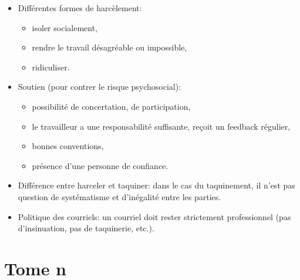 \documentclass[a4paper]{article}
\begin{document}
\begin{itemize}
\item Différentes formes de harcèlement:
\begin{itemize}
    \item isoler socialement,
    \item rendre le travail désagréable ou impossible,
    \item ridiculiser.
\end{itemize}





\item Soutien (pour contrer le risque psychosocial):
\begin{itemize}
    \item possibilité de concertation, de participation,
    \item le travailleur a une responsabilité suffisante, reçoit un feedback régulier,
    \item bonnes conventions,
    \item présence d'une personne de confiance.
\end{itemize}





\item Différence entre harceler et taquiner: dans le cas du taquinement, il n’est pas question de systématisme et d’inégalité entre les parties.





\item Politique des courriels: un courriel doit rester strictement professionnel (pas d’insinuation, pas de taquinerie, etc.).





\end{itemize}















\section{Tome n}
\end{document}
